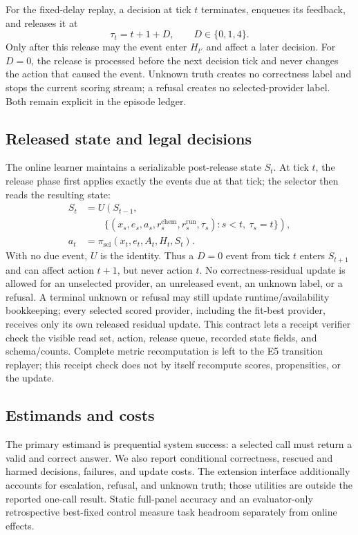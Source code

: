 \documentclass[sigconf,anonymous]{aamas}
\begin{document}
For the fixed-delay replay, a decision at tick $t$ terminates, enqueues its feedback, and releases it at
$$
\tau_t=t+1+D,\qquad D\in\{0,1,4\}.
$$
Only after this release may the event enter $H_{t'}$ and affect a later decision. For $D=0$, the release is processed before the next decision tick and never changes the action that caused the event. Unknown truth creates no correctness label and stops the current scoring stream; a refusal creates no selected-provider label. Both remain explicit in the episode ledger.

\subsection{Released state and legal decisions}
The online learner maintains a serializable post-release state $S_t$. At tick $t$, the release phase first applies exactly the events due at that tick; the selector then reads the resulting state:
$$
\begin{aligned}
S_t&=U\left(S_{t-1},\right.\\[-2pt]
&\qquad\left.\{(x_s,e_s,a_s,r_s^{\mathrm{chem}},r_s^{\mathrm{run}},\tau_s):s<t,\ \tau_s=t\}\right),\\
a_t&=\pi_{\mathrm{sel}}(x_t,e_t,A_t,H_t,S_t).
\end{aligned}
$$
With no due event, $U$ is the identity. Thus a $D=0$ event from tick $t$ enters $S_{t+1}$ and can affect action $t+1$, but never action $t$.
No correctness-residual update is allowed for an unselected provider, an unreleased event, an unknown label, or a refusal. A terminal unknown or refusal may still update runtime/availability bookkeeping; every selected scored provider, including the fit-best provider, receives only its own released residual update. This contract lets a receipt verifier check the visible read set, action, release queue, recorded state fields, and schema/counts. Complete metric recomputation is left to the E5 transition replayer; this receipt check does not by itself recompute scores, propensities, or the update.

\subsection{Estimands and costs}
The primary estimand is prequential system success: a selected call must return a valid and correct answer. We also report conditional correctness, rescued and harmed decisions, failures, and update costs. The extension interface additionally accounts for escalation, refusal, and unknown truth; those utilities are outside the reported one-call result. Static full-panel accuracy and an evaluator-only retrospective best-fixed control measure task headroom separately from online effects.
\end{document}
